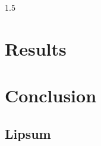 \documentclass[12pt, a4paper, oneside]{book}
\begin{document}
\begin{spacing}{1.5}
		\chapter{Results}
		\label{chap:Results}
		\lipsum[9]
		\chapter{Conclusion}
		\label{chap:Conclusion}
		\lipsum[10]
		\begin{singlespace}
			\clearpage
			\renewcommand{\bibname}{References}
			
			\clearpage
		\end{singlespace}
		\begin{appendices}
			\chapter{Lipsum}
			\lipsum[11]
		\end{appendices}
		\backmatter
	\end{spacing}
\end{document}
